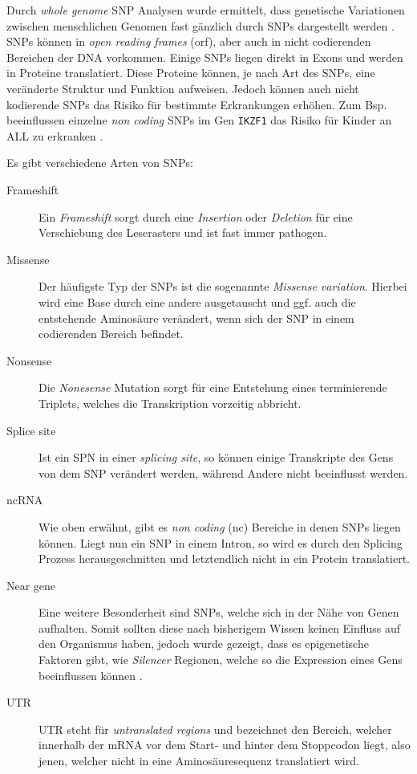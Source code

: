 Durch \emph{whole genome} \ac{SNP} Analysen wurde ermittelt, dass genetische Variationen zwischen menschlichen Genomen fast gänzlich durch \ac{SNP}s dargestellt werden \cite{Do.2015}. 
\ac{SNP}s können in \emph{open reading frames} (orf), aber auch in nicht codierenden Bereichen der DNA vorkommen. Einige \ac{SNP}s liegen direkt in Exons und werden in Proteine translatiert. Diese Proteine können, je nach Art des \ac{SNP}s, eine veränderte Struktur und Funktion aufweisen. Jedoch können auch nicht kodierende \ac{SNP}s das Risiko für bestimmte Erkrankungen erhöhen. Zum Bsp. beeinflussen einzelne \emph{non coding} \ac{SNP}s im Gen \texttt{IKZF1} das Risiko für Kinder an ALL zu erkranken \cite{Papaemmanuil.2009}.

Es gibt verschiedene Arten von \ac{SNP}s:

\begin{description}
\item[Frameshift]
Ein \emph{Frameshift} sorgt durch eine \emph{Insertion} oder \emph{Deletion} für eine Verschiebung des Leserasters und ist fast immer pathogen.
\item[Missense]
Der häufigste Typ der \ac{SNP}s ist die sogenannte \emph{Missense variation}. Hierbei wird eine Base durch eine andere ausgetauscht und ggf. auch die entstehende Aminosäure verändert, wenn sich der \ac{SNP} in einem codierenden Bereich befindet. 
\item[Nonsense]
Die \emph{Nonesense} Mutation sorgt für eine Entstehung eines terminierende Triplets, welches die Transkription vorzeitig abbricht.
\item[Splice site]
Ist ein SPN in einer \emph{splicing site}, so können einige Transkripte des Gens von dem \ac{SNP} verändert werden, während Andere nicht beeinflusst werden.
\item[ncRNA]
Wie oben erwähnt, gibt es \emph{non coding} (nc) Bereiche in denen \ac{SNP}s liegen können. Liegt nun ein \ac{SNP} in einem Intron, so wird es durch den Splicing Prozess herausgeschnitten und letztendlich nicht in ein Protein translatiert. 
\item[Near gene]
Eine weitere Besonderheit sind SNPs, welche sich in der Nähe von Genen aufhalten. Somit sollten diese nach bisherigem Wissen keinen Einfluss auf den Organismus haben, jedoch wurde gezeigt, dass es epigenetische Faktoren gibt, wie \emph{Silencer} Regionen, welche so die Expression eines Gens beeinflussen können \cite{Maston.2006}. 
\item[UTR]
UTR steht für \emph{untranslated regions} und bezeichnet den Bereich, welcher innerhalb der mRNA vor dem Start- und hinter dem Stoppcodon liegt, also jenen, welcher nicht in eine Aminosäuresequenz translatiert wird.
\end{description}

